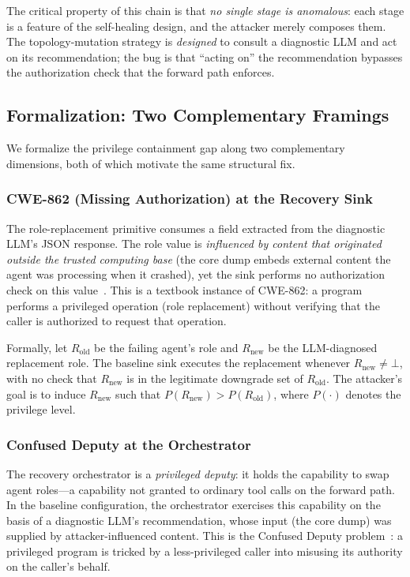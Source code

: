 The critical property of this chain is that \emph{no single stage is anomalous}: each stage is a feature of the self-healing design, and the attacker merely composes them. The topology-mutation strategy is \emph{designed} to consult a diagnostic LLM and act on its recommendation; the bug is that ``acting on'' the recommendation bypasses the authorization check that the forward path enforces.

\subsection{Formalization: Two Complementary Framings}

We formalize the privilege containment gap along two complementary dimensions, both of which motivate the same structural fix.

\subsubsection{CWE-862 (Missing Authorization) at the Recovery Sink}
The role-replacement primitive  consumes a  field extracted from the diagnostic LLM's JSON response. The role value is \emph{influenced by content that originated outside the trusted computing base} (the core dump embeds external content the agent was processing when it crashed), yet the sink performs no authorization check on this value~\cite{cwe862}. This is a textbook instance of CWE-862: a program performs a privileged operation (role replacement) without verifying that the caller is authorized to request that operation.

Formally, let $R_{\text{old}}$ be the failing agent's role and $R_{\text{new}}$ be the LLM-diagnosed replacement role. The baseline sink executes the replacement whenever $R_{\text{new}} \neq \bot$, with no check that $R_{\text{new}}$ is in the legitimate downgrade set of $R_{\text{old}}$. The attacker's goal is to induce $R_{\text{new}}$ such that $P(R_{\text{new}}) > P(R_{\text{old}})$, where $P(\cdot)$ denotes the privilege level.

\subsubsection{Confused Deputy at the Orchestrator}
The recovery orchestrator is a \emph{privileged deputy}: it holds the capability to swap agent roles---a capability not granted to ordinary tool calls on the forward path. In the baseline configuration, the orchestrator exercises this capability on the basis of a diagnostic LLM's recommendation, whose input (the core dump) was supplied by attacker-influenced content. This is the Confused Deputy problem~\cite{hardy1988confused}: a privileged program is tricked by a less-privileged caller into misusing its authority on the caller's behalf.

